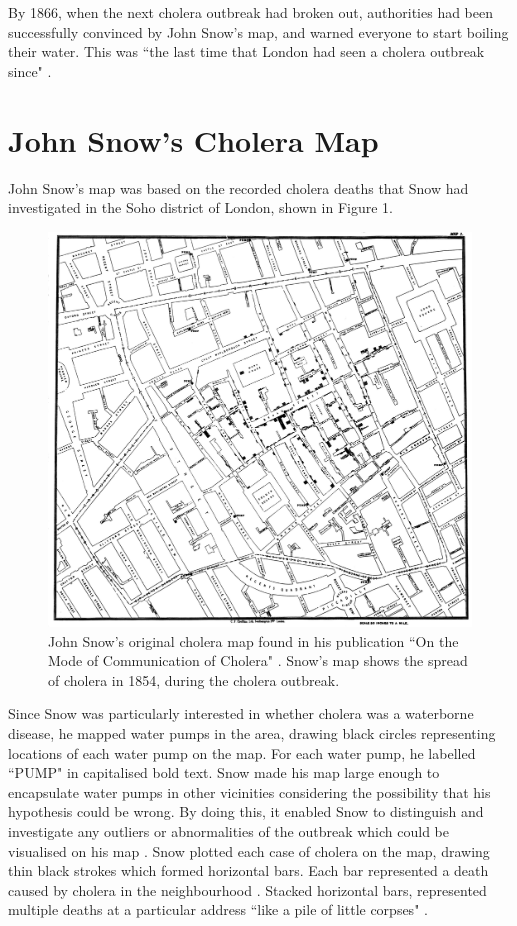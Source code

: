 \documentclass[12pt]{article}
\begin{document}
By 1866, when the next cholera outbreak had broken out, authorities had been successfully convinced by John Snow's map, and warned everyone to start boiling their water. This was ``the last time that London had seen a cholera outbreak since" \cite{tedtalk}.

\section{John Snow's Cholera Map}

John Snow's map was based on the recorded cholera deaths that Snow had investigated in the Soho district of London, shown in Figure 1.

\begin{figure}
\centering
\vspace*{-3cm}
\hspace*{-3cm} 
\includegraphics[scale=0.183]{Snow-cholera-map-1}
\caption{John Snow's original cholera map found in his publication ``On the Mode of Communication of Cholera" \cite{original}. Snow's map shows the spread of cholera in 1854, during the cholera outbreak. }
\label{fig:snow}
\end{figure}

Since Snow was particularly interested in whether cholera was a waterborne disease, he mapped water pumps in the area, drawing black circles representing locations of each water pump on the map. For each water pump, he labelled ``PUMP" in capitalised bold text. Snow made his map large enough to encapsulate water pumps in other vicinities considering the possibility that his hypothesis could be wrong. By doing this, it enabled Snow to distinguish and investigate any outliers or abnormalities of the outbreak which could be visualised on his map \cite{blog}. Snow plotted each case of cholera on the map, drawing thin black strokes which formed horizontal bars. Each bar represented a death caused by cholera in the neighbourhood \cite{tedtalk}. Stacked horizontal bars, represented multiple deaths at a particular address ``like a pile of little corpses" \cite{blog}.
\end{document}
